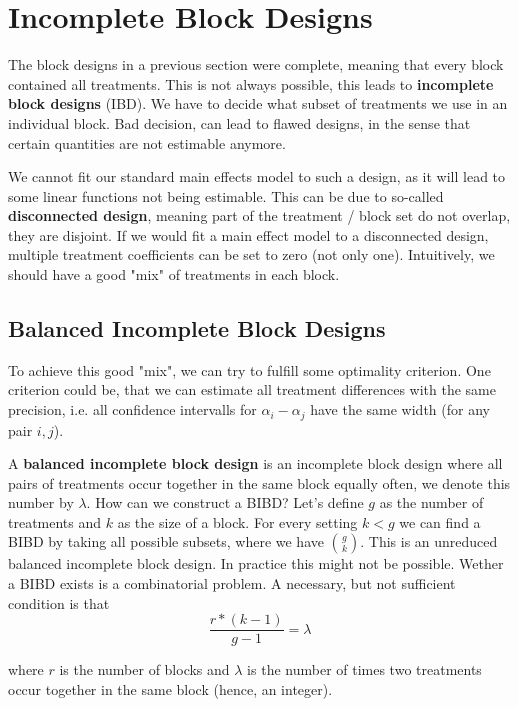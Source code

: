 \section{Incomplete Block Designs}

The block designs in a previous section were complete, meaning that every block contained all treatments. This is not always possible, this leads to \textbf{incomplete block designs} (IBD). We have to decide what subset of treatments we use in an individual block. Bad decision, can lead to flawed designs, in the sense that certain quantities are not estimable anymore. \medskip

We cannot fit our standard main effects model to such a design, as it will lead to some linear functions not being estimable. This can be due to so-called \textbf{disconnected design}, meaning part of the treatment / block set do not overlap, they are disjoint. If we would fit a main effect model to a disconnected design, multiple treatment coefficients can be set to zero (not only one). Intuitively, we should have a good "mix" of treatments in each block.\medskip


\subsection{Balanced Incomplete Block Designs}

To achieve this good "mix",  we can try to fulfill some optimality criterion. One criterion could be, that we can estimate all treatment differences with the same precision, i.e. all confidence intervalls for $\alpha_i - \alpha_j$ have the same width (for any pair $i,j$).\medskip

A \textbf{balanced incomplete block design} is an incomplete block design where all pairs of treatments occur together in the same block equally often, we denote this number by $\lambda$.  How can we construct a BIBD? Let's define $g$ as the number of treatments and $k$ as the size of a block. For every setting $k < g$ we can find a BIBD by taking all possible subsets, where we have $\binom{g}{k}$. This is an unreduced balanced incomplete block design. In practice this might not be possible. Wether a BIBD exists is a combinatorial problem. A necessary, but not sufficient condition is that 
$$\frac{r * (k - 1)}{g - 1} = \lambda$$

where $r$ is the number of blocks and $\lambda$ is the number of times two treatments occur together in the same block (hence, an integer). \medskip

